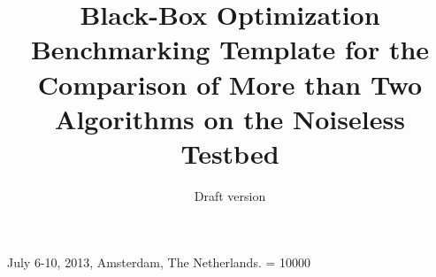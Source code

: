 \documentclass{sig-alternate}
\begin{document}
%
 {July 6-10, 2013, Amsterdam, The Netherlands.}
\widowpenalty = 10000

\title{Black-Box Optimization Benchmarking Template for the Comparison of More than Two Algorithms on the Noiseless Testbed}
\subtitle{Draft version
}

%
%
%
%
%
\end{document}
